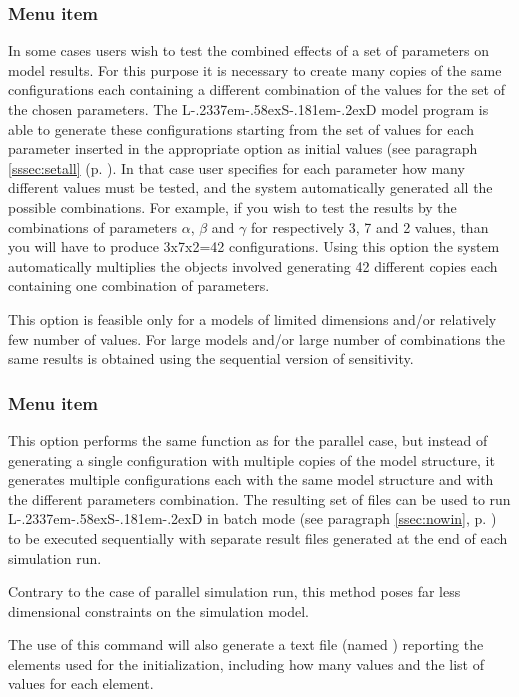 \documentclass [11pt,a4paper] {book}
\def\LsD{{L\kern-.2337em\lower-.58ex\hbox{S}\kern-.181em\lower-.2ex\hbox{D}}\xspace}
\begin{document}
\subsubsection{Menu item \label{sssec:senspar}}

In some cases users wish to test the combined effects of a set of parameters on model results. For this purpose it is necessary to create many copies of the same configurations each containing a different combination of the values for the set of the chosen parameters. The \LsD model program is able to generate these configurations starting from the set of values for each parameter inserted in the appropriate option as initial values (see paragraph \ref{sssec:setall} (p. \pageref{sssec:setall}). In that case user specifies for each parameter how many different values must be tested, and the system automatically generated all the possible combinations. For example, if you wish to test the results by the combinations of parameters $\alpha$, $\beta$ and $\gamma$ for respectively 3, 7 and 2 values, than you will have to produce 3x7x2=42 configurations. Using this option the system automatically multiplies the objects involved generating 42 different copies each containing one combination of parameters.

This option is feasible only for a models of limited dimensions and/or relatively few number of values. For large models and/or large number of combinations the same results is obtained using the sequential version of sensitivity.

\subsubsection{Menu item  }\label{sssec:sensseq}

This option performs the same function as for the parallel case, but instead of generating a single configuration with multiple copies of the model structure, it generates multiple configurations each with the same model structure and with the different parameters combination. The resulting set of files can be used to run \LsD in batch mode (see paragraph \ref{ssec:nowin}, p. \pageref{ssec:nowin}) to be executed sequentially with separate result files generated at the end of each simulation run.

Contrary to the case of parallel simulation run, this method poses far less dimensional constraints on the simulation model.

The use of this command will also generate a text file (named ) reporting the elements used for the initialization, including how many values and the list of values for each element.
\end{document}
